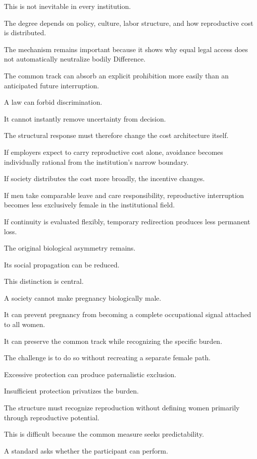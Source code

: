 This is not inevitable in every institution.

The degree depends on policy, culture, labor structure, and how reproductive cost is distributed.

The mechanism remains important because it shows why equal legal access does not automatically neutralize bodily Difference.

The common track can absorb an explicit prohibition more easily than an anticipated future interruption.

A law can forbid discrimination.

It cannot instantly remove uncertainty from decision.

The structural response must therefore change the cost architecture itself.

If employers expect to carry reproductive cost alone, avoidance becomes individually rational from the institution’s narrow boundary.

If society distributes the cost more broadly, the incentive changes.

If men take comparable leave and care responsibility, reproductive interruption becomes less exclusively female in the institutional field.

If continuity is evaluated flexibly, temporary redirection produces less permanent loss.

The original biological asymmetry remains.

Its social propagation can be reduced.

This distinction is central.

A society cannot make pregnancy biologically male.

It can prevent pregnancy from becoming a complete occupational signal attached to all women.

It can preserve the common track while recognizing the specific burden.

The challenge is to do so without recreating a separate female path.

Excessive protection can produce paternalistic exclusion.

Insufficient protection privatizes the burden.

The structure must recognize reproduction without defining women primarily through reproductive potential.

This is difficult because the common measure seeks predictability.

A standard asks whether the participant can perform.

